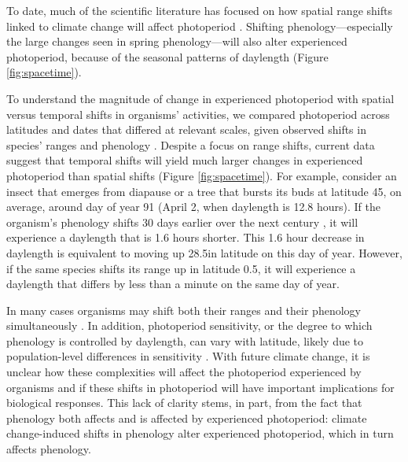 \documentclass{article}
\begin{document}
\par To date, much of the scientific literature has focused on how spatial range shifts linked to climate change will affect photoperiod \citep[e.g.,][]{saikkonen2012,way2015}. Shifting phenology---especially the large changes seen in spring phenology---will also alter experienced photoperiod, because of the seasonal patterns of daylength (Figure \ref{fig:spacetime}). 

\par To understand the magnitude of change in experienced photoperiod with spatial versus temporal shifts in organisms' activities, we compared photoperiod across latitudes and dates that differed at relevant scales, given observed shifts in species' ranges and phenology \citep{parmesan2003,chen2011}. Despite a focus on range shifts, current data suggest that temporal shifts will yield much larger changes in experienced photoperiod than spatial shifts (Figure \ref{fig:spacetime}). %
For example, consider an insect that emerges from diapause or a tree that bursts its buds at latitude 45\degree, on average, around day of year 91 (April 2, when daylength is 12.8 hours). If the organism's phenology shifts 30 days earlier over the next century \citep[][i.e., a rate of ~3 days per decade, as has been observed]{parmesan2003}, it will experience a daylength that is 1.6 hours shorter. This 1.6 hour decrease in daylength is equivalent to moving up 28.5\degree  in latitude on this day of year. However, if the same species shifts its range up in latitude 0.5\degree \citep[i.e., 60 km over the next century,  comparable to observed rates,][]{parmesan2003,chen2011}, it will experience a daylength that differs by less than a minute on the same day of year. 

\par In many cases organisms may shift both their ranges and their phenology simultaneously \citep[i.e., due to new climatic conditions,][]{duputie2015,grevstad2015}. In addition, photoperiod sensitivity, or the degree to which phenology is controlled by daylength, can vary with latitude, likely due to population-level differences in sensitivity \citep{Howe:1996,saikkonen2012,Partanen:2005aa,Vihera-Aarnio:2006aa,Caffarra:2011b,gauzere2017}.
With future climate change, it is unclear how these complexities will affect the photoperiod experienced by organisms and if these shifts in photoperiod will have important implications for biological responses. This lack of clarity stems, in part, from the fact that phenology both affects and is affected by experienced photoperiod: climate change-induced shifts in phenology alter experienced photoperiod, which in turn affects phenology.%
\end{document}
